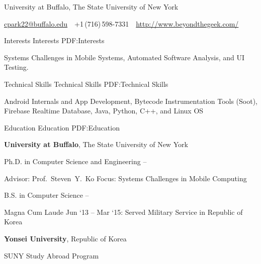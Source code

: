 \documentclass[letterpaper,MMMyyyy,nonstopmode]{simpleresumecv}
\newcommand{\CVAuthor}{Chang Min Park}
\newcommand{\CVWebpage}{http://www.beyondthegeek.com/}
\begin{document}

\Title{\CVAuthor}

\begin{SubTitle}
University at Buffalo, The State University of New York
\par
\href{mailto:cpark22@buffalo.edu}
{cpark22@buffalo.edu}
\,\SubBulletSymbol\,
+1\,(716)\,598-7331
\,\SubBulletSymbol\,
\href{\CVWebpage}
{\url{\CVWebpage}}
\end{SubTitle}

\begin{Body}


\Section
{Interests}
{Interests}
{PDF:Interests}

\Entry
Systems Challenges in Mobile Systems, Automated Software Analysis, and UI Testing.


\Section
{Technical Skills}
{Technical Skills}
{PDF:Technical Skills}

\Entry
Android Internals and App Development, Bytecode Instrumentation Tools (Soot), Firebase
Realtime Database, Java, Python, C++, and Linux OS
\BigGap


\Section
{Education}
{Education}
{PDF:Education}

\Entry
\textbf{University at Buffalo}, The State University of New York

\Gap
\BulletItem
Ph.D. in Computer Science and Engineering
\hfill
{} --
\begin{Detail}
\SubBulletItem
Advisor:
Prof.~Steven~Y.~Ko
\SubBulletItem
Focus:
Systems Challenges in Mobile Computing
\end{Detail}

\Gap
\BulletItem
B.S. in Computer Science
\hfill
{} --
\begin{Detail}
\SubBulletItem
Magna Cum Laude
\SubBulletItem
Jun `13 -- Mar `15: Served Military Service in Republic of Korea
\end{Detail}

\BigGap
\Entry
\textbf{Yonsei University}, Republic of Korea

\Gap
\BulletItem
SUNY Study Abroad Program
\hfill
{}


\end{Body}
\end{document}

